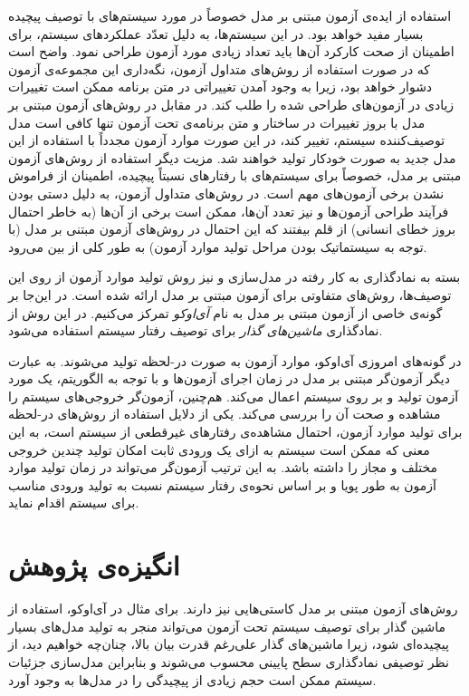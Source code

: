استفاده از ایده‌ی آزمون مبتنی بر مدل خصوصاً در مورد سیستم‌های با توصیف پیچیده بسیار مفید خواهد بود. در این سیستم‌ها، به دلیل تعدّد عملکرد‌های سیستم، برای اطمینان از صحت کارکرد آن‌ها باید تعداد زیادی مورد آزمون طراحی نمود. واضح است که در صورت استفاده از روش‌های متداول آزمون، نگه‌داری این مجموعه‌ی آزمون دشوار خواهد بود، زیرا به وجود آمدن تغییراتی در متن برنامه ممکن است تغییرات زیادی در آزمون‌های طراحی شده را طلب کند. در مقابل در  روش‌های آزمون مبتنی بر مدل با بروز تغییرات در ساختار و متن برنامه‌ی تحت آزمون تنها کافی است مدل توصیف‌کننده سیستم، تغییر کند، در این صورت موارد آزمون مجدداً با استفاده از این مدل جدید به صورت خودکار تولید خواهند شد. مزیت دیگر استفاده از روش‌های آزمون مبتنی بر مدل، خصوصاً برای سیستم‌های با رفتارهای نسبتاً پیچیده، اطمینان از فراموش نشدن برخی آزمون‌های مهم است. در روش‌های متداول آزمون، به دلیل دستی بودن فرآیند طراحی آزمون‌ها و نیز تعدد آن‌ها، ممکن است برخی از آن‌ها (به خاطر احتمال بروز خطای انسانی) از قلم بیفتند که این احتمال در روش‌های آزمون مبتنی بر مدل (با توجه به سیستماتیک بودن مراحل تولید موارد آزمون) به طور کلی از بین می‌رود.

بسته به نمادگذاری به کار رفته در مدل‌سازی و نیز روش تولید موارد آزمون از روی این توصیف‌ها، روش‌های متفاوتی برای آزمون مبتنی بر مدل ارائه شده است. در این‌جا بر گونه‌ی خاصی از آزمون مبتنی بر مدل به نام \emph{آی‌او‌کو}\cite{tret96} تمرکز می‌کنیم. در این روش از نمادگذاری \emph{ماشین‌های گذار} برای توصیف رفتار سیستم استفاده می‌شود. 

در گونه‌های امروزی آی‌او‌کو، موارد آزمون به صورت در-لحظه تولید می‌شوند. به عبارت دیگر آزمون‌گر مبتنی بر مدل در زمان اجرای آزمون‌ها و با توجه به الگوریتم، یک مورد آزمون تولید و بر روی سیستم اعمال می‌کند. هم‌چنین، آزمون‌گر خروجی‌های سیستم را مشاهده و صحت آن را بررسی می‌کند. یکی از دلایل استفاده از روش‌های در-لحظه برای تولید موارد آزمون، احتمال مشاهده‌ی رفتارهای غیرقطعی از سیستم است، به این معنی که ممکن است سیستم به ازای یک ورودی ثابت امکان تولید چندین خروجی مختلف و مجاز را داشته باشد. به این ترتیب آزمون‌گر می‌تواند در زمان تولید موارد آزمون به طور پویا و بر اساس نحوه‌ی رفتار سیستم نسبت به تولید ورودی مناسب برای سیستم اقدام نماید.

\section{انگیزه‌ی پژوهش}
روش‌های آزمون مبتنی بر مدل کاستی‌هایی نیز دارند. برای مثال در آی‌اوکو، استفاده از ماشین گذار برای توصیف سیستم تحت آزمون می‌تواند منجر به تولید مدل‌های بسیار پیچیده‌ای شود، زیرا ماشین‌های گذار علی‌رغم قدرت بیان بالا، چنا‌ن‌چه خواهیم دید، از نظر توصیفی نمادگذاری سطح پایینی محسوب می‌شوند و بنابراین مدل‌سازی جزئیات سیستم ممکن است حجم زیادی از پیچیدگی را در مدل‌ها به وجود آورد.

